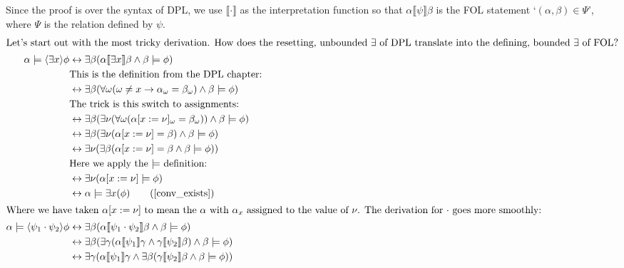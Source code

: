 \documentclass[12pt]{article}
\begin{document}
Since the proof is over the syntax of DPL, we use $\llbracket\cdot\rrbracket$ as the interpretation function so that $\alpha\llbracket\psi\rrbracket\beta$ is the FOL statement `$(\alpha,\beta)\in\Psi$', where $\Psi$ is the relation defined by $\psi$.
\begin{align}
%
\intertext{Let's start out with the most tricky derivation. How does the resetting, unbounded $\exists$ of DPL translate into the defining, bounded $\exists$ of FOL?}
%
\alpha\models\langle\exists x\rangle\phi
 & \leftrightarrow \exists\beta (\alpha\llbracket\exists x\rrbracket\beta \wedge \beta\models\phi) \nonumber\\
 & \text{This is the definition from the DPL chapter:}\nonumber\\
 & \leftrightarrow \exists\beta (\forall\omega (\omega \neq x \rightarrow \alpha_{\omega} = \beta_{\omega}) \wedge \beta\models\phi) \nonumber\\
 & \text{The trick is this switch to assignments:}\nonumber\\
 & \leftrightarrow \exists\beta (\exists\nu (\forall\omega (\alpha[x:=\nu]_{\omega} = \beta_{\omega})) \wedge \beta\models\phi) \nonumber\\
 & \leftrightarrow \exists\beta (\exists\nu (\alpha[x:=\nu] = \beta) \wedge \beta\models\phi) \nonumber\\
 & \leftrightarrow \exists\nu (\exists\beta (\alpha[x:=\nu] = \beta \wedge \beta\models\phi)) \nonumber\\
 & \text{Here we apply the $\models$ definition:}\nonumber\\
 & \leftrightarrow \exists\nu (\alpha[x:=\nu]\models\phi) \nonumber\\
 & \leftrightarrow \alpha\models\exists x (\phi) \tag{$\ref{conv_exists}$} \\
%
\intertext{Where we have taken $\alpha[x:=\nu]$ to mean the $\alpha$ with $\alpha_x$ assigned to the value of $\nu$.
The derivation for $\cdot$ goes more smoothly:}
%
\alpha\models\langle\psi_1\cdot\psi_2\rangle\phi
 & \leftrightarrow \exists\beta (\alpha\llbracket\psi_1\cdot\psi_2\rrbracket\beta \wedge \beta\models\phi) \nonumber\\
 & \leftrightarrow \exists\beta(\exists\gamma (\alpha\llbracket\psi_1\rrbracket\gamma \wedge \gamma\llbracket\psi_2\rrbracket\beta) \wedge \beta\models\phi) \nonumber\\
 & \leftrightarrow \exists\gamma (\alpha\llbracket\psi_1\rrbracket\gamma \wedge \exists\beta(\gamma\llbracket\psi_2\rrbracket\beta \wedge \beta\models\phi)) \nonumber\\

\end{align}
\end{document}
